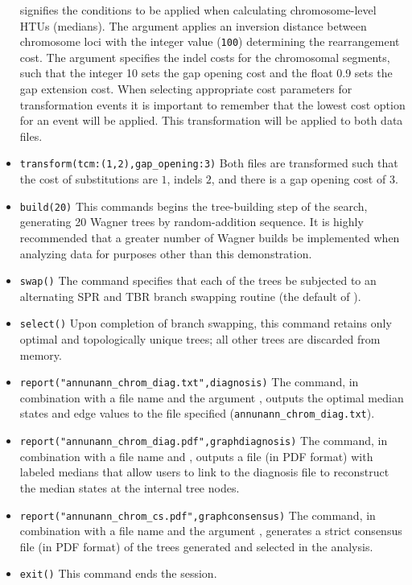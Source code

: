 \begin{itemize}
 signifies the conditions to be applied
when calculating chromosome-level HTUs (medians).  The argument
 applies an inversion distance between
chromosome loci with the integer value (\texttt{100}) determining
the rearrangement cost. The argument 
specifies the indel costs for the chromosomal segments, such that
the integer 10 sets the gap opening cost and the float 0.9 sets the
gap extension cost.  When selecting appropriate cost parameters for
transformation events it is important to remember that the lowest
cost option for an event will be applied. This transformation will
be applied to both data files.  
\item \texttt{transform(tcm:(1,2),gap\_opening:3)} Both files are transformed
such that the cost of substitutions are $1$, indels $2$, and there
is a gap opening cost of $3$.  
\item \texttt{build(20)} This commands
begins the tree-building step of the search, generating 20 Wagner
trees by random-addition sequence.  It is highly recommended that
a greater number of Wagner builds be implemented when analyzing
data for purposes other than this demonstration.  
\item \texttt{swap()} The  command specifies that 
each of the trees be subjected to an alternating SPR and TBR branch 
swapping routine (the default of \poy).  
\item \texttt{select()} Upon completion of
branch swapping, this command retains only optimal and topologically
unique trees; all other trees are discarded from memory.  
\item \texttt{report("annunann\_chrom\_diag.txt",diagnosis)} The
 command, in combination with a file name and
the argument , outputs the optimal median
states and edge values to the file specified
(\texttt{annunann\_chrom\_diag.txt}).  
\item \texttt{report("annunann\_chrom\_diag.pdf",graphdiagnosis)} The
 command, in combination with a file name and
, outputs a file (in PDF format) with
labeled medians that allow users to link to the diagnosis file to
reconstruct the median states at the internal tree nodes.  
\item \texttt{report("annunann\_chrom\_cs.pdf",graphconsensus)}  The
 command, in combination with a file name and
the argument , generates a strict
consensus file (in PDF format) of the trees generated and selected
in the analysis.  
\item \texttt{exit()} This command ends the \poy session.  
\end{itemize}

